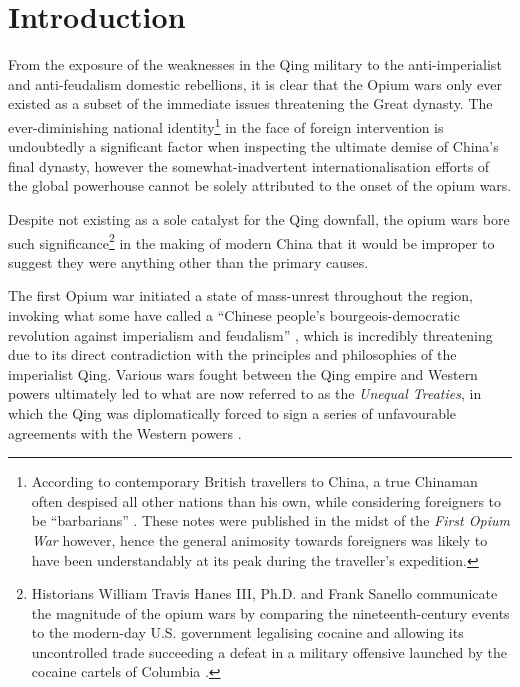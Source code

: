 \documentclass{article}
\begin{document}
\section{Introduction}

        From the exposure of the weaknesses in the Qing military to the anti-imperialist and anti-feudalism domestic rebellions, it is clear that the Opium wars only ever existed as a subset of the immediate issues threatening the Great dynasty. The ever-diminishing national identity\footnote{According to contemporary British travellers to China, a true Chinaman often despised all other nations than his own, while considering foreigners to be ``barbarians'' \autocite{McPherson:1842}. These notes were published in the midst of the \textit{First Opium War} however, hence the general animosity towards foreigners was likely to have been understandably at its peak during the traveller's expedition.} in the face of foreign intervention is undoubtedly a significant factor when inspecting the ultimate demise of China's final dynasty, however the somewhat-inadvertent internationalisation efforts of the global powerhouse cannot be solely attributed to the onset of the opium wars.

        Despite not existing as a sole catalyst for the Qing downfall, the opium wars bore such significance\footnote{Historians William Travis Hanes III, Ph.D. and Frank Sanello communicate the magnitude of the opium wars by comparing the nineteenth-century events to the modern-day U.S. government legalising cocaine and allowing its uncontrolled trade succeeding a defeat in a military offensive launched by the cocaine cartels of Columbia \autocite{Hanes:2004}.} in the making of modern China that it would be improper to suggest they were anything other than the primary causes.

        The first Opium war initiated a state of mass-unrest throughout the region, invoking what some have called a ``Chinese people's bourgeois-democratic revolution against imperialism and feudalism'' \autocite{Janin:1999}, which is incredibly threatening due to its direct contradiction with the principles and philosophies of the imperialist Qing. Various wars fought between the Qing empire and Western powers ultimately led to what are now referred to as the \textit{Unequal Treaties}, in which the Qing was diplomatically forced to sign a series of unfavourable agreements with the Western powers \autocite{Wang:2005}.
\end{document}
